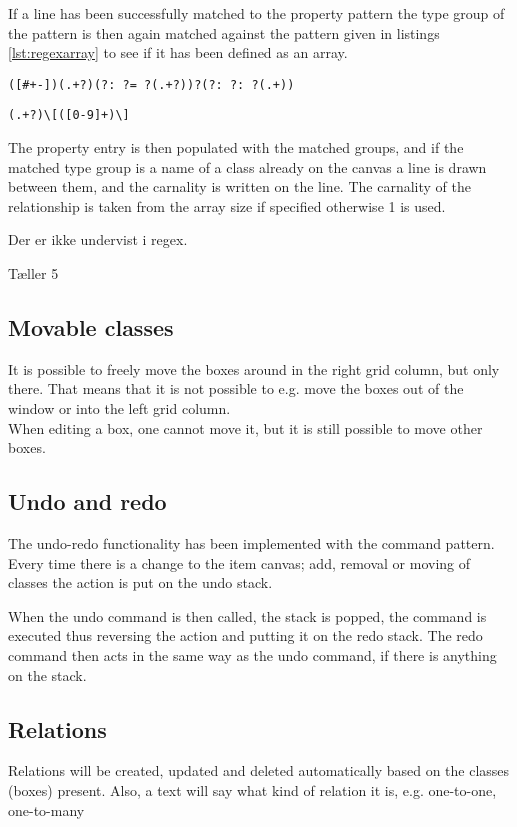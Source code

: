 If a line has been successfully matched to the property pattern the type group of the pattern is then again matched against the pattern given in listings \ref{lst:regexarray} to see if it has been defined as an array.

\begin{lstlisting}[caption={RegEx for property matching},label=lst:regexprop]
([#+-])(.+?)(?: ?= ?(.+?))?(?: ?: ?(.+))
\end{lstlisting}

\begin{lstlisting}[caption={RegEx for array matching},label=lst:regexarray]
(.+?)\[([0-9]+)\]
\end{lstlisting}

The property entry is then populated with the matched groups, and if the matched type group is a name of a class already on the canvas a line is drawn between them, and the carnality is written on the line.
The carnality of the relationship is taken from the array size if specified otherwise 1 is used.

Der er ikke undervist i regex.

Tæller 5

\subsection{Movable classes}

It is possible to freely move the boxes around in the right grid column, but only there. That means that it is not possible to e.g. move the boxes out of the window or into the left grid column.\\
When editing a box, one cannot move it, but it is still possible to move other boxes.

\subsection{Undo and redo}
The undo-redo functionality has been implemented with the command pattern.
Every time there is a change to the item canvas; add, removal or moving of classes the action is put on the undo stack.

When the undo command is then called, the stack is popped, the command is executed thus reversing the action and putting it on the redo stack. The redo command then acts in the same way as the undo command, if there is anything on the stack.

\subsection{Relations}
Relations will be created, updated and deleted automatically based on the classes (boxes) present. Also, a text will say what kind of relation it is, e.g. one-to-one, one-to-many

